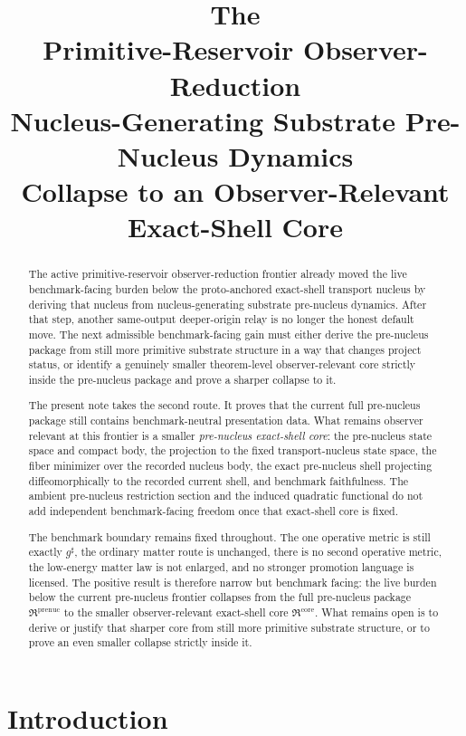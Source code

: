 \documentclass[11pt]{article}
\title{\textbf{The \TheoryName{}}\\[0.4em]
\large Primitive-Reservoir Observer-Reduction\\
\large Nucleus-Generating Substrate Pre-Nucleus Dynamics\\
\large Collapse to an Observer-Relevant Exact-Shell Core}
\author{}
\date{}
\newcommand{\CompletedMetric}{g^{\sharp}}
\newcommand{\PreNucPackage}{\mathfrak R^{\mathrm{prenuc}}}
\newcommand{\PreNucCore}{\mathfrak R^{\mathrm{core}}}
\begin{document}
\maketitle

\begin{abstract}
The active primitive-reservoir observer-reduction frontier already moved the live benchmark-facing burden below the proto-anchored exact-shell transport nucleus by deriving that nucleus from nucleus-generating substrate pre-nucleus dynamics. After that step, another same-output deeper-origin relay is no longer the honest default move. The next admissible benchmark-facing gain must either derive the pre-nucleus package from still more primitive substrate structure in a way that changes project status, or identify a genuinely smaller theorem-level observer-relevant core strictly inside the pre-nucleus package and prove a sharper collapse to it.

The present note takes the second route. It proves that the current full pre-nucleus package still contains benchmark-neutral presentation data. What remains observer relevant at this frontier is a smaller \emph{pre-nucleus exact-shell core}: the pre-nucleus state space and compact body, the projection to the fixed transport-nucleus state space, the fiber minimizer over the recorded nucleus body, the exact pre-nucleus shell projecting diffeomorphically to the recorded current shell, and benchmark faithfulness. The ambient pre-nucleus restriction section and the induced quadratic functional do not add independent benchmark-facing freedom once that exact-shell core is fixed.

The benchmark boundary remains fixed throughout. The one operative metric is still exactly \(\CompletedMetric\), the ordinary matter route is unchanged, there is no second operative metric, the low-energy matter law is not enlarged, and no stronger promotion language is licensed. The positive result is therefore narrow but benchmark facing: the live burden below the current pre-nucleus frontier collapses from the full pre-nucleus package \(\PreNucPackage\) to the smaller observer-relevant exact-shell core \(\PreNucCore\). What remains open is to derive or justify that sharper core from still more primitive substrate structure, or to prove an even smaller collapse strictly inside it.
\end{abstract}

\section{Introduction}
\end{document}
